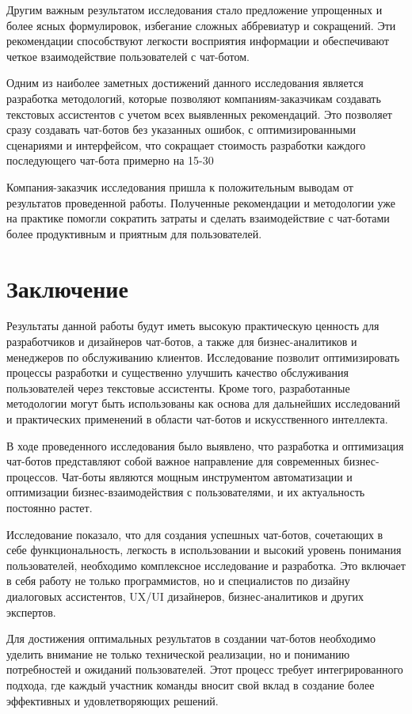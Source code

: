 \documentclass{article}
\begin{document}
Другим важным результатом исследования стало предложение упрощенных и более ясных формулировок, избегание сложных аббревиатур и сокращений. Эти рекомендации способствуют легкости восприятия информации и обеспечивают четкое взаимодействие пользователей с чат-ботом.

Одним из наиболее заметных достижений данного исследования является разработка методологий, которые позволяют компаниям-заказчикам создавать текстовых ассистентов с учетом всех выявленных рекомендаций. Это позволяет сразу создавать чат-ботов без указанных ошибок, с оптимизированными сценариями и интерфейсом, что сокращает стоимость разработки каждого последующего чат-бота примерно на 15-30%

Компания-заказчик исследования пришла к положительным выводам от результатов проведенной работы. Полученные рекомендации и методологии уже на практике помогли сократить затраты и сделать взаимодействие с чат-ботами более продуктивным и приятным для пользователей.
\section{Заключение}
Результаты данной работы будут иметь высокую практическую ценность для разработчиков и дизайнеров чат-ботов, а также для бизнес-аналитиков и менеджеров по обслуживанию клиентов. Исследование позволит оптимизировать процессы разработки и существенно улучшить качество обслуживания пользователей через текстовые ассистенты. Кроме того, разработанные методологии могут быть использованы как основа для дальнейших исследований и практических применений в области чат-ботов и искусственного интеллекта.

В ходе проведенного исследования было выявлено, что разработка и оптимизация чат-ботов представляют собой важное направление для современных бизнес-процессов. Чат-боты являются мощным инструментом автоматизации и оптимизации бизнес-взаимодействия с пользователями, и их актуальность постоянно растет.

Исследование показало, что для создания успешных чат-ботов, сочетающих в себе функциональность, легкость в использовании и высокий уровень понимания пользователей, необходимо комплексное исследование и разработка. Это включает в себя работу не только программистов, но и специалистов по дизайну диалоговых ассистентов, UX/UI дизайнеров, бизнес-аналитиков и других экспертов.

Для достижения оптимальных результатов в создании чат-ботов необходимо уделить внимание не только технической реализации, но и пониманию потребностей и ожиданий пользователей. Этот процесс требует интегрированного подхода, где каждый участник команды вносит свой вклад в создание более эффективных и удовлетворяющих решений.
\end{document}
